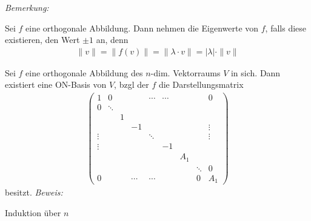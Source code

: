 
\textit{Bemerkung:}\medskip

Sei $f$ eine orthogonale Abbildung. Dann nehmen die Eigenwerte von $f$, falls diese existieren, den Wert $\pm 1$ an, denn
\begin{align*}
    \| v \| = \| f(v) \| = \| \lambda \cdot v\| = | \lambda | \cdot \| v \|
\end{align*}


\begin{mysatz}
    Sei $f$ eine orthogonale Abbildung des $n$-dim. Vektorraums $V$ in sich.
    Dann existiert eine ON-Basis von $V$, bzgl der $f$ die Darstellungsmatrix
    \begin{align*}
        \begin{pmatrix}
            1 & 0 & & & \cdots &\cdots & & & 0 \\
            0 & \ddots & & & & & & & \\
            & & 1 & & & & & & \\
            & & & -1 & & & & & \vdots \\
            \vdots & & & & \ddots & & &  &\vdots \\
            \vdots & & & & & -1 & & & \\
            & & & & & & A_1 & & \\
            & & & & & & & \ddots & 0 \\
            0 & & & \cdots & \cdots & & & 0 & A_1
        \end{pmatrix}
    \end{align*}
    besitzt.
    \textit{Beweis:} \medskip

    Induktion über $n$
\end{mysatz}
